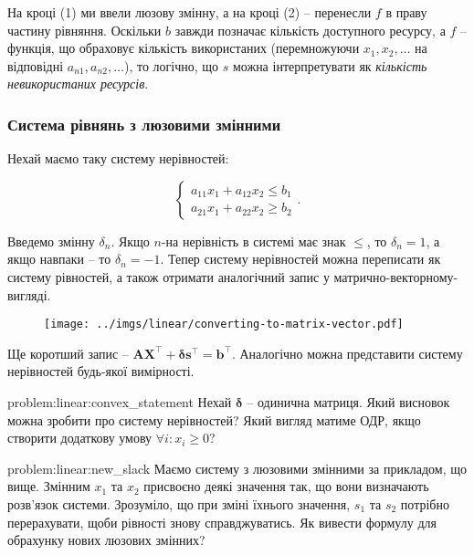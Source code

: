 \documentclass[\main/book.tex]{subfiles}
\begin{document}
На кроці (1) ми ввели люзову змінну, а на кроці (2) -- перенесли $f$ в праву частину рівняння. Оскільки $b$ завжди позначає кількість доступного ресурсу, а $f$ -- функція, що обраховує кількість використаних (перемножуючи $x_1, x_2, \ldots$ на відповідні $a_{n1}, a_{n2}, \ldots$), то логічно, що $s$ можна інтерпретувати як \textit{кількість невикористаних ресурсів}.

\subsubsection{Система рівнянь з люзовими змінними}

Нехай маємо таку систему нерівностей:

\[
 \left\{
  \begin{array}{l}
   a_{11} x_1 + a_{12} x_2 \leq b_1 \\
   a_{21} x_1 + a_{22} x_2 \geq b_2
  \end{array}
 \right. .
\]

Введемо змінну $\delta_n$. Якщо $n$-на нерівність в системі має знак \flqq{}$\leq$\frqq{}, то $\delta_n=1$, а якщо навпаки -- то $\delta_n=-1$. Тепер систему нерівностей можна переписати як систему рівностей, а також отримати аналогічний запис у матрично-векторному-вигляді.

\begin{figure}[!h]
 \center
 \texttt{[image: ../imgs/linear/converting-to-matrix-vector.pdf]}
\end{figure}

Ще коротший запис -- $\mathbf{A} \mathbf{X}^\top + \mathbf{\delta} \mathbf{s}^\top = \mathbf{b}^\top$. Аналогічно можна представити систему нерівностей будь-якої вимірності.

\begin{problem}{problem:linear:convex_statement}
 Нехай $\mathbf{\delta}$ -- одинична матриця. Який висновок можна зробити про систему нерівностей? Який вигляд матиме ОДР, якщо створити додаткову умову $\forall i: x_i \geq 0$?
\end{problem}

\begin{problem}{problem:linear:new_slack}
 Маємо систему з люзовими змінними за прикладом, що вище. Змінним $x_1$ та $x_2$ присвоєно деякі значення так, що вони визначають розв'язок системи. Зрозуміло, що при зміні їхнього значення, $s_1$ та $s_2$ потрібно перерахувати, щоби рівності знову справджуватись. Як вивести формулу для обрахунку нових люзових змінних?
\end{problem}
\end{document}
